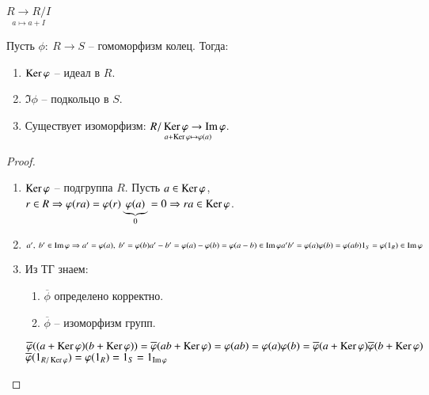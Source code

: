 \documentclass[main]{subfiles}
\begin{document}
\begin{example}
    $\underset{a \mapsto a+I}{R \rightarrow R/I}$
\end{example}

\begin{theorem}
    Пусть $\phi: \ R \rightarrow S$ -- гомоморфизм колец. Тогда:
    \begin{enumerate}
        \item $\Ker \phi$ -- идеал в $R$.
        \item $\Im \phi$ -- подкольцо в $S$.
        \item Существует изоморфизм: $\underset{a+\Ker \phi \mapsto \phi(a)}{R/\Ker \phi \rightarrow \Im \phi}$.
    \end{enumerate}
\end{theorem}

\begin{proof}
    \begin{enumerate}
        \item $\Ker \phi$ -- подгруппа $R$. Пусть $a \in \Ker \phi$, $r \in R \Rightarrow
        \phi(ra) = \phi(r)\underbrace{\phi(a)}_{0} = 0 \Rightarrow ra \in \Ker \phi$.
        \item $a', \ b' \in \Im \phi \Rightarrow a' = \phi(a), \ b' = \phi(b) \\
        a' - b' = \phi (a) - \phi (b) = \phi (a - b) \in \Im \phi \\
        a'b' = \phi (a) \phi (b) = \phi (ab) \\
        1_S = \phi(1_R) \in \Im \phi$
        \item Из ТГ знаем:
        \begin{enumerate}
            \item $\overline{\phi}$ определено корректно.
            \item $\overline{\phi}$ -- изоморфизм групп.
        \end{enumerate}
        $\overline{\phi}((a + \Ker \phi)(b + \Ker \phi)) = 
        \overline{\phi}(ab + \Ker \phi) = \phi(ab) = \phi(a)\phi(b) = \overline{\phi}(a + \Ker \phi) \overline{\phi}(b + \Ker \phi)$ \\
        $\overline{\phi}(1_{R/\Ker \phi}) = \phi(1_R) = 1_S = 1_{\Im \phi}$

    \end{enumerate}
\end{proof}
\end{document}
